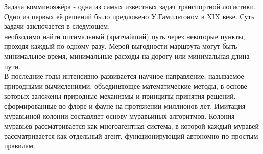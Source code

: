 \documentclass[../main.tex]{subfiles}
\begin{document}
	
	Задача коммивояжёра - одна из самых известных задач транспортной логистики. Одно из первых её решений было предложено У.Гамильтоном в XIX веке.
	Суть задачи заключается в следующем:\\
	необходимо найти оптимальный (кратчайший) путь через некоторые пункты, проходя каждый по одному разу. Мерой выгодности маршрута могут быть минимальное время, минимальные расходы на дорогу или минимальная длина пути. \cite{TSP} \\
	
	В последние годы интенсивно развивается научное направление, называемое природными вычислениями, объединяющее математические методы, в основе которых заложены природные механизмы и принципы принятия решений, сформированные во флоре и фауне на протяжении миллионов лет. 
	Имитация муравьиной колонии составляет основу муравьиных алгоритмов. 
	Колония муравьёв рассматривается как многоагентная система, в которой каждый муравей рассматривается как отдельный агент, функционирующий автономно по простым правилам. \cite{AntAlg}
	
\end{document}
